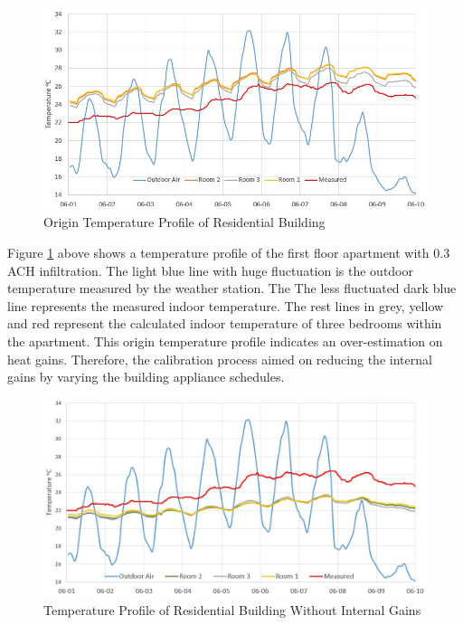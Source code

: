 \documentclass[a4paper, oneside]{discothesis}
\begin{document}
			\begin{figure}[H]
			\centering
			\includegraphics[scale=0.7]{figures/Hongg_Clibration_Origin.JPG}
			\caption{Origin Temperature Profile of Residential Building}
			\label{fig:HonggCalibrationOrigin}
			\end{figure}
			
			Figure \ref{fig:HonggCalibrationOrigin} above shows a temperature profile of the first floor apartment with 0.3 ACH infiltration. The light blue line with huge fluctuation is the outdoor temperature measured by the weather station. The The less fluctuated dark blue line represents the measured indoor temperature. The rest lines in grey, yellow and red represent the calculated indoor temperature of three bedrooms within the apartment. This origin temperature profile indicates an over-estimation on heat gains. Therefore, the calibration process aimed on reducing the internal gains by varying the building appliance schedules.\\
			
			\begin{figure}[H]
			\centering
			\includegraphics[scale=0.6]{figures/Hongg_Cali_NoFacility.JPG}
			\caption{Temperature Profile of Residential Building Without Internal Gains}
			\label{fig:HonggCalibrationNoGains}
			\end{figure}
			
\end{document}
